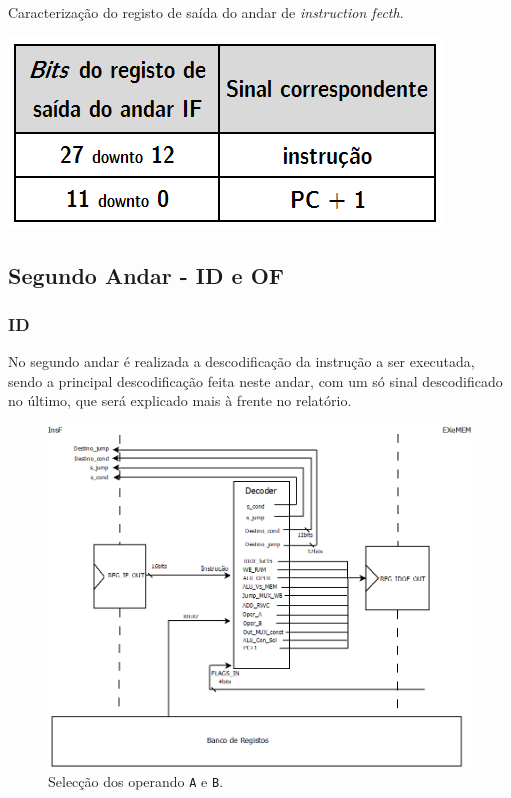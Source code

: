\documentclass[11pt]{article}
\numberwithin{equation}{section}
\begin{document}

\begin{table}[h]
	\centering
	\caption{Caracterização do registo de saída do andar de \textit{instruction fecth}.}
	\vspace{-2mm}
 	\includegraphics[keepaspectratio=true, scale=0.35]{tabelas/regIF}
\end{table}

\subsection{Segundo Andar - ID e OF}

\subsubsection{ID}

No segundo andar é realizada a descodificação da instrução a ser executada, sendo a principal descodificação feita neste andar, com um só sinal descodificado no último, que será explicado mais à frente no relatório.

\begin{figure}[H]
	\centering
	\includegraphics[keepaspectratio=true, scale=0.5]{imagens/idof}
	\caption{Selecção dos operando \texttt{A} e \texttt{B}.}
	\vspace{-0.8em}
\end{figure}
\end{document}

